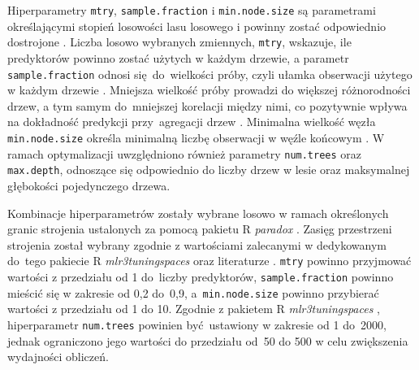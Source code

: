 \documentclass{amuthesis}
\begin{document}
Hiperparametry \texttt{mtry}, \texttt{sample.fraction} i
\texttt{min.node.size} są parametrami określającymi stopień losowości
lasu losowego i powinny zostać odpowiednio dostrojone
\autocite{probst_2019_hyperparameters}. Liczba losowo wybranych
zmiennych, \texttt{mtry}, wskazuje, ile predyktorów powinno zostać
użytych w każdym drzewie, a parametr \texttt{sample.fraction} odnosi
się~do~wielkości próby, czyli ułamka obserwacji użytego w każdym drzewie
\autocite{lovelace_2019_geocomputation}. Mniejsza wielkość próby
prowadzi do większej różnorodności drzew, a tym samym do~mniejszej
korelacji między nimi, co pozytywnie wpływa na dokładność predykcji
przy~agregacji drzew \autocite{probst_2019_hyperparameters}. Minimalna
wielkość węzła \texttt{min.node.size} określa minimalną liczbę
obserwacji w węźle końcowym \autocite{probst_2019_hyperparameters}. W
ramach optymalizacji uwzględniono również parametry \texttt{num.trees}
oraz \texttt{max.depth}, odnoszące się odpowiednio do liczby drzew w
lesie oraz maksymalnej głębokości pojedynczego drzewa.

Kombinacje hiperparametrów zostały wybrane losowo w ramach określonych
granic strojenia ustalonych za pomocą pakietu R \emph{paradox}
\autocite{R-paradox}. Zasięg przestrzeni strojenia został wybrany
zgodnie z wartościami zalecanymi w dedykowanym do~tego pakiecie R
\emph{mlr3tuningspaces} \autocite{R-mlr3tuningspaces} oraz literaturze
\autocite{probst_2019_hyperparameters,schratz_2019_hyperparameters}.
\texttt{mtry} powinno przyjmować wartości z przedziału od 1 do~liczby
predyktorów, \texttt{sample.fraction} powinno mieścić się w zakresie od
0,2 do~0,9, a~\texttt{min.node.size} powinno przybierać wartości z
przedziału od 1 do 10. Zgodnie z pakietem R \emph{mlr3tuningspaces}
\autocite{R-mlr3tuningspaces}, hiperparametr \texttt{num.trees} powinien
być~ustawiony w zakresie od 1 do~2000, jednak ograniczono jego wartości
do przedziału od~50 do 500 w celu zwiększenia wydajności obliczeń.
\end{document}
